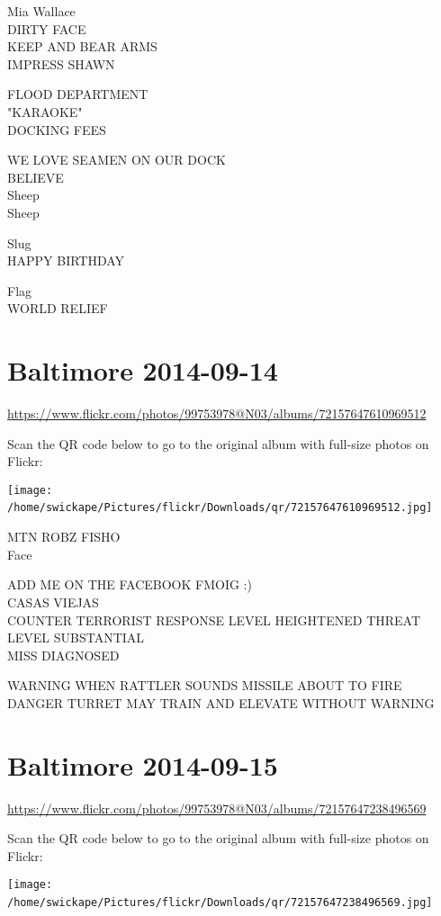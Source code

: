 \documentclass[10pt,letterpaper]{article}
\begin{document}
Mia Wallace\\
DIRTY FACE\\
KEEP AND BEAR ARMS\\
IMPRESS SHAWN

FLOOD DEPARTMENT\\
"KARAOKE"\\
DOCKING FEES

WE LOVE SEAMEN ON OUR DOCK\\
BELIEVE\\
Sheep\\
Sheep

Slug\\
HAPPY BIRTHDAY

Flag\\
WORLD RELIEF
\

\section*{Baltimore 2014-09-14}

\url{https://www.flickr.com/photos/99753978@N03/albums/72157647610969512}

Scan the QR code below to go to the original album with full-size photos on Flickr:

\texttt{[image: /home/swickape/Pictures/flickr/Downloads/qr/72157647610969512.jpg]}
\

MTN ROBZ FISHO\\
Face

ADD ME ON THE FACEBOOK FMOIG :)\\
CASAS VIEJAS\\
COUNTER TERRORIST RESPONSE LEVEL HEIGHTENED THREAT LEVEL SUBSTANTIAL\\
MISS DIAGNOSED

WARNING WHEN RATTLER SOUNDS MISSILE ABOUT TO FIRE\\
DANGER TURRET MAY TRAIN AND ELEVATE WITHOUT WARNING
\

\section*{Baltimore 2014-09-15}

\url{https://www.flickr.com/photos/99753978@N03/albums/72157647238496569}

Scan the QR code below to go to the original album with full-size photos on Flickr:

\texttt{[image: /home/swickape/Pictures/flickr/Downloads/qr/72157647238496569.jpg]}
\
\end{document}
